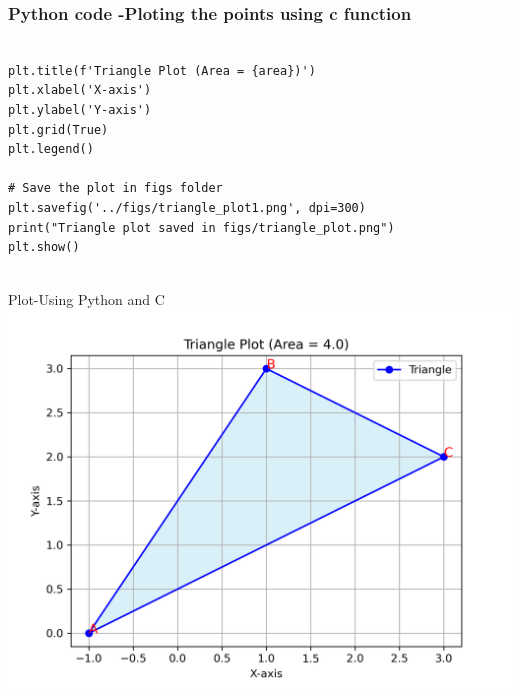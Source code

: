 \documentclass{beamer}
\begin{document}
	
\begin{frame}[fragile]                              
	\frametitle{Python code -Ploting the points using c function} 
	\begin{lstlisting}

plt.title(f'Triangle Plot (Area = {area})')
plt.xlabel('X-axis')
plt.ylabel('Y-axis')
plt.grid(True)
plt.legend()

# Save the plot in figs folder
plt.savefig('../figs/triangle_plot1.png', dpi=300)
print("Triangle plot saved in figs/triangle_plot.png")
plt.show()


\end{lstlisting}                               
\end{frame}

\begin{frame}{Plot-Using  Python and C}
    \centering
    \includegraphics[width=\columnwidth, height=0.8\textheight, keepaspectratio]{../figs/triangle_plot1.png}     
\end{frame}

	
\end{document}
